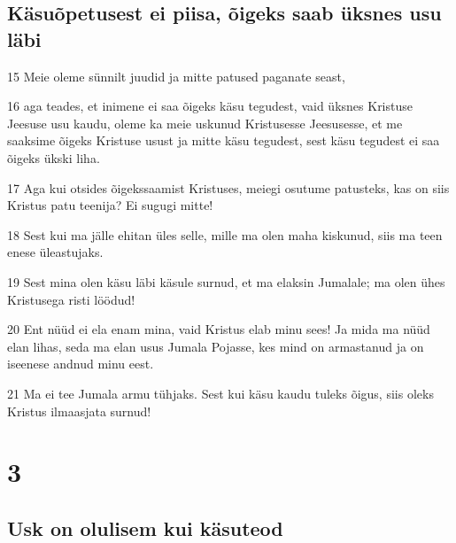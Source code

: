 \section*{Käsuõpetusest ei piisa, õigeks saab üksnes usu läbi}

\par 15 Meie oleme sünnilt juudid ja mitte patused paganate seast,
\par 16 aga teades, et inimene ei saa õigeks käsu tegudest, vaid üksnes Kristuse Jeesuse usu kaudu, oleme ka meie uskunud Kristusesse Jeesusesse, et me saaksime õigeks Kristuse usust ja mitte käsu tegudest, sest käsu tegudest ei saa õigeks ükski liha.
\par 17 Aga kui otsides õigekssaamist Kristuses, meiegi osutume patusteks, kas on siis Kristus patu teenija? Ei sugugi mitte!
\par 18 Sest kui ma jälle ehitan üles selle, mille ma olen maha kiskunud, siis ma teen enese üleastujaks.
\par 19 Sest mina olen käsu läbi käsule surnud, et ma elaksin Jumalale; ma olen ühes Kristusega risti löödud!
\par 20 Ent nüüd ei ela enam mina, vaid Kristus elab minu sees! Ja mida ma nüüd elan lihas, seda ma elan usus Jumala Pojasse, kes mind on armastanud ja on iseenese andnud minu eest.
\par 21 Ma ei tee Jumala armu tühjaks. Sest kui käsu kaudu tuleks õigus, siis oleks Kristus ilmaasjata surnud!



\chapter{3}

\section*{Usk on olulisem kui käsuteod}

